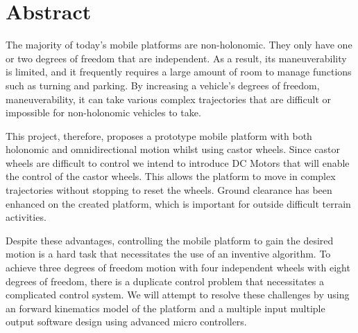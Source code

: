 \section*{Abstract}
\label{sec:}

The majority of today's mobile platforms are non-holonomic.
They only have one or two degrees of freedom that are independent.
As a result, its maneuverability is limited, and it frequently requires a large amount of room to manage functions such as turning and parking.
By increasing a vehicle's degrees of freedom, maneuverability, it can take various complex trajectories that are difficult or impossible for non-holonomic vehicles to take.
\par
This project, therefore, proposes a prototype mobile platform with both holonomic and omnidirectional motion whilst using castor wheels.
Since castor wheels are difficult to control we intend to introduce \ac{DC} Motors that will enable the control of the castor wheels.
This allows the platform to move in complex trajectories without stopping to reset the wheels.
Ground clearance has been enhanced on the created platform, which is important for outside difficult terrain activities.
\par
Despite these advantages, controlling the mobile platform to gain the desired motion is a hard task that necessitates the use of an inventive algorithm.
To achieve three degrees of freedom motion with four independent wheels with eight degrees of freedom, there is a duplicate control problem that necessitates a complicated control system. 
We will attempt to resolve these challenges by using an forward kinematics model of the platform and a multiple input multiple output software design using advanced micro controllers.
